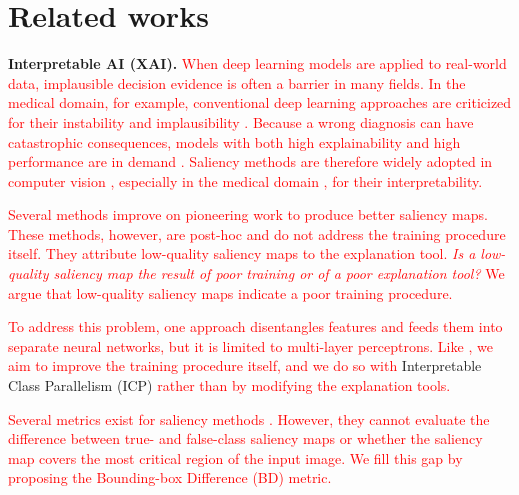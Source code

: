 \documentclass[preprint,7pt, a4paper]{elsarticle}
\begin{document}

\section{Related works}

\textbf{Interpretable AI (XAI).} \textcolor{red}{When deep learning models are applied to real-world data, implausible decision evidence is often a barrier in many fields. In the medical domain, for example, conventional deep learning approaches are criticized for their instability and implausibility \cite{15, 16}. Because a wrong diagnosis can have catastrophic consequences, models with both high explainability and high performance are in demand \cite{12,13,14}. Saliency methods are therefore widely adopted in computer vision \cite{22,23,24,25,26,27,28,29,30}, especially in the medical domain \cite{19,20,21}, for their interpretability.} 

\textcolor{red}{Several methods \cite{5,6,7} improve on pioneering work \cite{4,1,2} to produce better saliency maps. These methods, however, are post-hoc and do not address the training procedure itself. They attribute low-quality saliency maps to the explanation tool.} \textit{\textcolor{red}{Is a low-quality saliency map the result of poor training or of a poor explanation tool?}} \textcolor{red}{We argue that low-quality saliency maps indicate a poor training procedure.} 

\textcolor{red}{To address this problem, one approach \cite{8} disentangles features and feeds them into separate neural networks, but it is limited to multi-layer perceptrons. Like \cite{8}, we aim to improve the training procedure itself, and we do so with} Interpretable Class Parallelism (ICP) \textcolor{red}{rather than by modifying the explanation tools.}

\textcolor{red}{Several metrics exist for saliency methods \cite{9, 17, 18}. However, they cannot evaluate the difference between true- and false-class saliency maps or whether the saliency map covers the most critical region of the input image. We fill this gap by proposing the Bounding-box Difference (BD) metric.}
\end{document}
